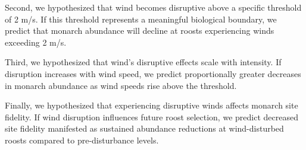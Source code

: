 Second, we hypothesized that wind becomes disruptive above a specific threshold of 2 m/s. If this threshold represents a meaningful biological boundary, we predict that monarch abundance will decline at roosts experiencing winds exceeding 2 m/s.

Third, we hypothesized that wind’s disruptive effects scale with intensity. If disruption increases with wind speed, we predict proportionally greater decreases in monarch abundance as wind speeds rise above the threshold.

Finally, we hypothesized that experiencing disruptive winds affects monarch site fidelity. If wind disruption influences future roost selection, we predict decreased site fidelity manifested as sustained abundance reductions at wind-disturbed roosts compared to pre-disturbance levels.